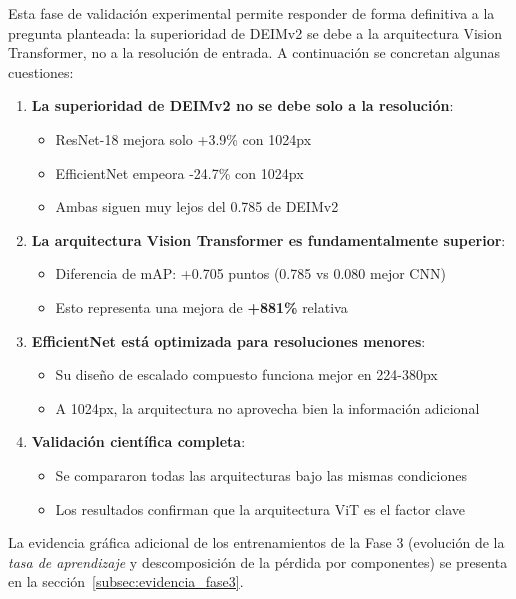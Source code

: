 Esta fase de validación experimental permite responder de forma definitiva a la pregunta planteada: la superioridad de DEIMv2 se debe a la arquitectura Vision Transformer, no a la resolución de entrada. A continuación se concretan algunas cuestiones:
\begin{enumerate}
    \item \textbf{La superioridad de DEIMv2 no se debe solo a la resolución}:
    \begin{itemize}
        \item ResNet-18 mejora solo +3.9\% con 1024px
        \item EfficientNet empeora -24.7\% con 1024px
        \item Ambas siguen muy lejos del 0.785 de DEIMv2
    \end{itemize}
    
    \item \textbf{La arquitectura Vision Transformer es fundamentalmente superior}:
    \begin{itemize}
        \item Diferencia de mAP: +0.705 puntos (0.785 vs 0.080 mejor CNN)
        \item Esto representa una mejora de \textbf{+881\%} relativa
    \end{itemize}
    
    \item \textbf{EfficientNet está optimizada para resoluciones menores}:
    \begin{itemize}
        \item Su diseño de escalado compuesto funciona mejor en 224-380px
        \item A 1024px, la arquitectura no aprovecha bien la información adicional
    \end{itemize}
    
    \item \textbf{Validación científica completa}:
    \begin{itemize}
        \item Se compararon todas las arquitecturas bajo las mismas condiciones
        \item Los resultados confirman que la arquitectura ViT es el factor clave
    \end{itemize}
\end{enumerate}

La evidencia gráfica adicional de los entrenamientos de la Fase 3 (evolución de la \textit{tasa de aprendizaje} y descomposición de la pérdida por componentes) se presenta en la sección~\ref{subsec:evidencia_fase3}.

